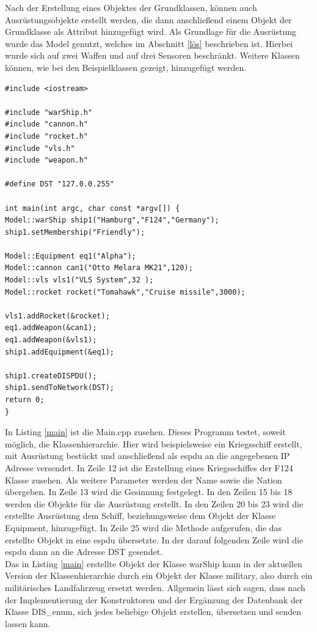 Nach der Erstellung eines Objektes der Grundklassen, können auch Ausrüstungsobjekte erstellt werden, die dann anschließend einem Objekt der Grundklasse als Attribut hinzugefügt wird. Als Grundlage für die Ausrüstung wurde das Model genutzt, welches im Abschnitt \ref{lös} beschrieben ist. Hierbei wurde sich auf zwei Waffen und auf drei Sensoren beschränkt. Weitere Klassen können, wie bei den Beispielklassen gezeigt, hinzugefügt werden. \\
\begin{lstlisting}[caption = main.cpp ,label= main]
#include <iostream>

#include "warShip.h"
#include "cannon.h"
#include "rocket.h"
#include "vls.h"
#include "weapon.h"

#define DST "127.0.0.255"

int main(int argc, char const *argv[]) {
Model::warShip ship1("Hamburg","F124","Germany");
ship1.setMembership("Friendly");

Model::Equipment eq1("Alpha");
Model::cannon can1("Otto Melara MK21",120);
Model::vls vls1("VLS System",32 );
Model::rocket rocket("Tomahawk","Cruise missile",3000);

vls1.addRocket(&rocket);
eq1.addWeapon(&can1);
eq1.addWeapon(&vls1);
ship1.addEquipment(&eq1);

ship1.createDISPDU();
ship1.sendToNetwork(DST);
return 0;
}
\end{lstlisting}
In Listing \ref{main} ist die Main.cpp zusehen. Dieses Programm testet, soweit möglich, die Klassenhierarchie. Hier wird beispielsweise ein Kriegsschiff erstellt, mit Ausrüstung  bestückt und anschließend als \ac{espdu} an die angegebenen IP Adresse versendet.
In Zeile 12 ist die Erstellung eines Kriegsschiffes der F124 Klasse zusehen. Als weitere Parameter werden der Name sowie die Nation übergeben. In Zeile 13 wird die Gesinnung festgelegt.   In den Zeilen 15 bis 18 werden die Objekte für die Ausrüstung erstellt. In den Zeilen 20 bis 23 wird die erstellte Ausrüstung dem Schiff, beziehungsweise dem Objekt der Klasse \glqq Equipment\grqq{}, hinzugefügt. In Zeile 25 wird die Methode aufgerufen, die das erstellte Objekt in eine \ac{espdu} übersetzte. In der darauf folgenden Zeile wird die \ac{espdu} dann an die Adresse \glqq DST\grqq{} gesendet.\\ 
Das in Listing \ref{main} erstellte Objekt der Klasse \glqq warShip\grqq{} kann in der aktuellen Version der Klassenhierarchie durch ein Objekt der Klasse \glqq military\grqq{}, also durch ein militärisches Landfahrzeug ersetzt werden. Allgemein lässt sich sagen, dass nach der Implementierung der Konstruktoren und der Ergänzung der Datenbank der Klasse \glqq DIS\_enum\grqq{}, sich jedes beliebige Objekt erstellen, übersetzen und senden lassen kann.  


